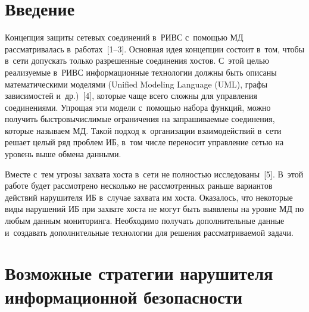 
  



\thispagestyle{headings}

\begin{multicols}{2}

\label{st\stat}

\section{Введение }

  Концепция защиты сетевых соединений в~\mbox{РИВС} с~по\-мощью 
МД рассматривалась в~работах~[1--3]. Основная идея концепции 
состоит в~том, чтобы в~сети допускать только разрешенные соединения хостов. 
С~этой целью реализуемые в~РИВС информационные технологии  должны 
быть описаны математическими моделями (Unified Modeling Language
(UML), графы зависимостей и~др.)~[4], 
которые чаще всего сложны для управления соединениями. Упрощая эти модели 
с~помощью набора функций, можно получить быст\-ро\-вы\-чис\-ли\-мые ограничения 
на запрашиваемые соединения, которые называем МД. Такой подход 
к~организации взаимодействий в~сети решает целый ряд проблем ИБ, в~том числе 
переносит управление сетью на уровень выше обмена дан\-ными.
  
  Вместе с~тем угрозы захвата хоста в~сети не полностью исследованы~[5]. 
В~этой работе будет рассмотрено несколько не рассмотренных раньше вариантов 
действий нарушителя ИБ в~случае захвата им хоста. Оказалось, что некоторые 
виды нарушений ИБ при захвате хоста не могут быть выявлены на уровне МД по 
любым данным мониторинга. Необходимо получать дополнительные данные 
и~создавать дополнительные технологии для решения рассматриваемой задачи.

\vspace*{-4pt}

\section{Возможные стратегии нарушителя информационной 
безопасности}

\vspace*{-2pt}


\end{multicols}
